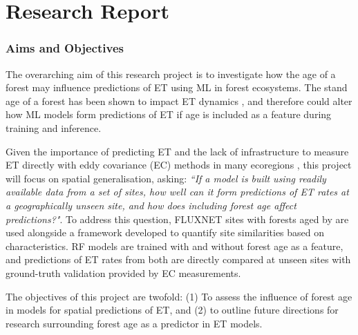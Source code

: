 
\part{Research Report}
\setcounter{section}{0}
\section{Aims and Objectives}
The overarching aim of this research project is to investigate how the age of a forest may influence predictions of \ac{ET} using \ac{ML} in forest ecosystems. The stand age of a forest has been shown to impact \ac{ET} dynamics \parencite{oishi2020}, and therefore could alter how ML models form predictions of \ac{ET} if age is included as a feature during training and inference. 
\par Given the importance of predicting \ac{ET} \parencite{amani2023review, liyew2025review} and the lack of infrastructure to measure \ac{ET} directly with eddy covariance (EC) methods in many ecoregions \parencite{hill2017}, this project will focus on spatial generalisation, asking: \textit{``If a model is built using readily available data from a set of sites, how well can it form predictions of \ac{ET} rates at a geographically unseen site, and how does including forest age affect predictions?"}. To address this question, FLUXNET sites with forests aged by \textcite{besnard2018} are used alongside a framework developed to quantify site similarities based on characteristics. \ac{RF} models are trained with and without forest age as a feature, and predictions of \ac{ET} rates from both are directly compared at unseen sites with ground-truth validation provided by EC measurements.
\par The objectives of this project are twofold: (1) To assess the influence of forest age in models for spatial predictions of \ac{ET}, and (2) to outline future directions for research surrounding forest age as a predictor in \ac{ET} models.


